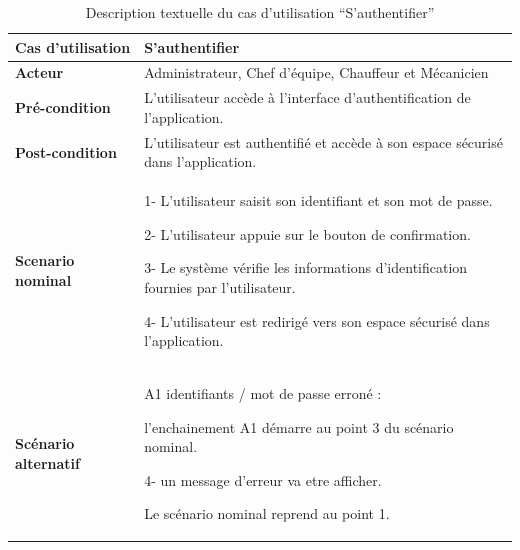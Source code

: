 \begin{table}[H]
  \centering
  \renewcommand{\arraystretch}{1.2}
  \begin{tabular}{|p{4cm}|p{9cm}|}
    \hline
    \textbf{Cas d'utilisation}   & S'authentifier                                                                                                                   \\
    \hline
    \textbf{Acteur}              & Administrateur, Chef d’équipe, Chauffeur et Mécanicien                                                                           \\
    \hline
    \textbf{Pré-condition}       & L'utilisateur accède à l'interface d'authentification de l'application.                                                          \\
    \hline
    \textbf{Post-condition}      & L'utilisateur est authentifié et accède à son espace sécurisé dans l'application.                                                \\
    \hline
    \textbf{Scenario nominal}    & 1- L'utilisateur saisit son identifiant et son mot de passe.\newline

    2- L'utilisateur appuie sur le bouton de confirmation.\newline

    3- Le système vérifie les informations d'identification fournies par l'utilisateur. \newline

    4- L'utilisateur est redirigé vers son espace sécurisé dans l'application.                                                                                      \\


    \hline
    \textbf{Scénario alternatif} & A1 identifiants / mot de passe erroné :                                                                                 \newline

    l'enchainement A1 démarre au point 3 du scénario nominal. \newline

    4- un message d'erreur va etre afficher. \newline

    Le scénario nominal reprend au point 1.                                                                                                                         \\
    \hline
  \end{tabular}
  \caption{Description textuelle du cas d’utilisation “S’authentifier”}

\end{table}

